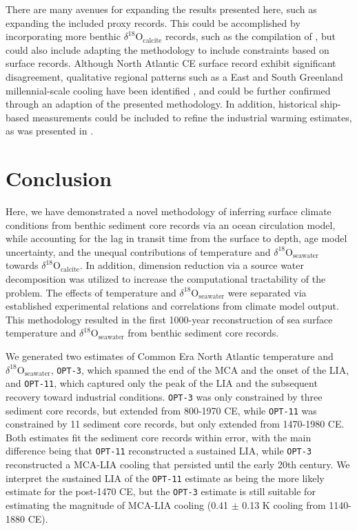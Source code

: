 \documentclass[draft]{agujournal2019}
\begin{document}
There are many avenues for expanding the results presented here, such as expanding the included proxy records. This could be accomplished by incorporating more benthic $\delta^{18}\mathrm{O}_{\mathrm{calcite}}$ records, such as the compilation of , but could also include adapting the methodology to include constraints based on surface records. Although North Atlantic CE surface record exhibit significant disagreement, qualitative regional patterns such as a East and South Greenland millennial-scale cooling have been identified \cite[]{MoffaSanchez:Variability}, and could be further confirmed through an adaption of the presented methodology. In addition, historical ship-based measurements could be included to refine the industrial warming estimates, as was presented in .

\section{Conclusion}
Here, we have demonstrated a novel methodology of inferring surface climate conditions from benthic sediment core records via an ocean circulation model, while accounting for the lag in transit time from the surface to depth, age model uncertainty, and the unequal contributions of temperature and $\delta^{18}\mathrm{O}_{\mathrm{seawater}}$ towards $\delta^{18}\mathrm{O}_{\mathrm{calcite}}$. In addition, dimension reduction via a source water decomposition was utilized to increase the computational tractability of the problem. The effects of temperature and $\delta^{18}\mathrm{O}_{\mathrm{seawater}}$ were separated via established experimental relations and correlations from climate model output. This methodology resulted in the first 1000-year reconstruction of sea surface temperature and $\delta^{18}\mathrm{O}_{\mathrm{seawater}}$ from benthic sediment core records.

We generated two estimates of Common Era North Atlantic temperature and $\delta^{18}\mathrm{O}_{\mathrm{seawater}}$, \texttt{OPT-3}, which spanned the end of the MCA and the onset of the LIA, and \texttt{OPT-11}, which captured only the peak of the LIA and the subsequent recovery toward industrial conditions. \texttt{OPT-3} was only constrained by three sediment core records, but extended from 800-1970 CE, while \texttt{OPT-11} was constrained by 11 sediment core records, but only extended from 1470-1980 CE. Both estimates fit the sediment core records within error, with the main difference being that \texttt{OPT-11} reconstructed a sustained LIA, while \texttt{OPT-3} reconstructed a MCA-LIA cooling that persisted until the early 20th century. We interpret the sustained LIA of the \texttt{OPT-11} estimate as being the more likely estimate for the post-1470 CE, but the \texttt{OPT-3} estimate is still suitable for estimating the magnitude of MCA-LIA cooling (0.41 $\pm$ 0.13 K cooling from 1140-1880 CE).
\end{document}
